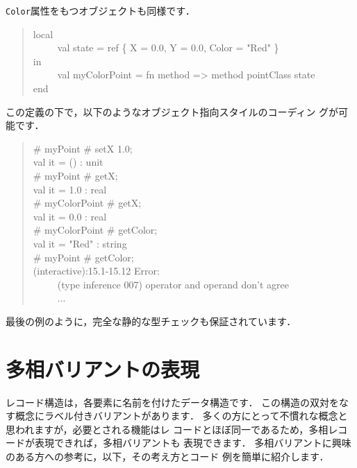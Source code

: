 \documentclass{jbook}
\newcommand{\myem}{\ \ \ \ \  }
\begin{document}
	{\tt Color}属性をもつオブジェクトも同様です．
\begin{tt}
\begin{quote}
local\\
\myem  val state =  ref \{ X = 0.0, Y = 0.0, Color = "Red" \}\\
in \\
\myem val myColorPoint = fn method => method pointClass state\\
end
\end{quote}
\end{tt}
	この定義の下で，以下のようなオブジェクト指向スタイルのコーディン
グが可能です．
\begin{tt}\begin{quote}
\# myPoint \# setX 1.0;\\
val it = () : unit\\
\# myPoint \# getX;\\
val it = 1.0 : real\\
\# myColorPoint \# getX;\\
val it = 0.0 : real\\
\# myColorPoint \# getColor;\\
val it = "Red" : string\\
\# myPoint \# getColor;\\
(interactive):15.1-15.12 Error:\\
\myem  (type inference 007) operator and operand don't agree\\
\myem ...
\end{quote}\end{tt}
	最後の例のように，完全な静的な型チェックも保証されています．

\section{多相バリアントの表現}
\label{sec:extensionVariant}

	レコード構造は，各要素に名前を付けたデータ構造です．
	この構造の双対をなす概念にラベル付きバリアントがあります．
	多くの方にとって不慣れな概念と思われますが，必要とされる機能はレ
コードとほぼ同一であるため，多相レコードが表現できれば，多相バリアントも
表現できます．
	多相バリアントに興味のある方への参考に，以下，その考え方とコード
例を簡単に紹介します．
\end{document}
